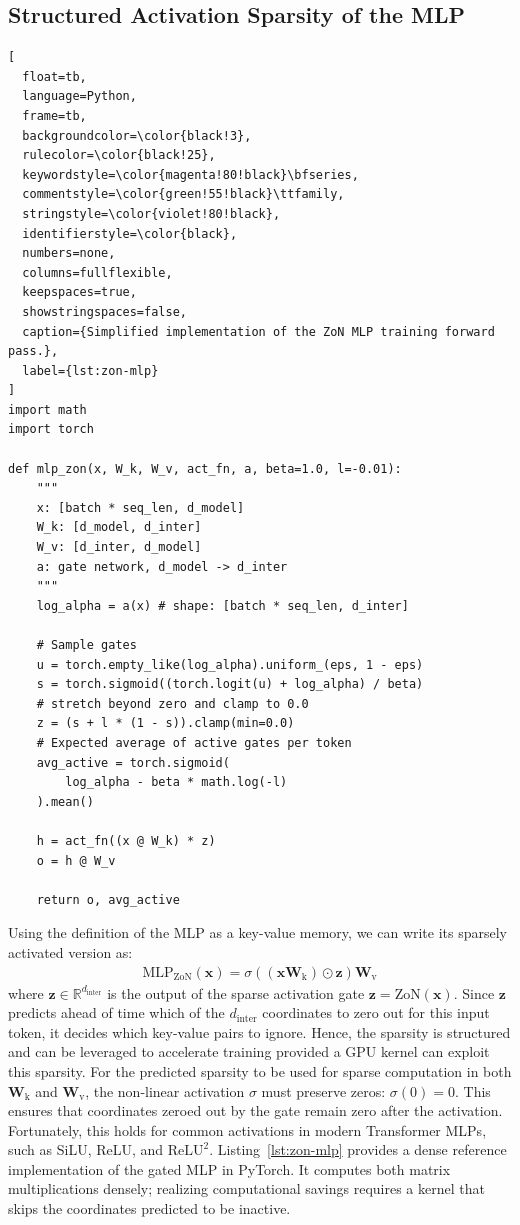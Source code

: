 \subsection{Structured Activation Sparsity of the MLP}
\begin{lstlisting}[
  float=tb,
  language=Python,
  frame=tb,
  backgroundcolor=\color{black!3},
  rulecolor=\color{black!25},
  keywordstyle=\color{magenta!80!black}\bfseries,
  commentstyle=\color{green!55!black}\ttfamily,
  stringstyle=\color{violet!80!black},
  identifierstyle=\color{black},
  numbers=none,
  columns=fullflexible,
  keepspaces=true,
  showstringspaces=false,
  caption={Simplified implementation of the ZoN MLP training forward pass.},
  label={lst:zon-mlp}
]
import math
import torch

def mlp_zon(x, W_k, W_v, act_fn, a, beta=1.0, l=-0.01):
    """
    x: [batch * seq_len, d_model]
    W_k: [d_model, d_inter]
    W_v: [d_inter, d_model]
    a: gate network, d_model -> d_inter
    """
    log_alpha = a(x) # shape: [batch * seq_len, d_inter]

    # Sample gates
    u = torch.empty_like(log_alpha).uniform_(eps, 1 - eps)
    s = torch.sigmoid((torch.logit(u) + log_alpha) / beta)
    # stretch beyond zero and clamp to 0.0
    z = (s + l * (1 - s)).clamp(min=0.0)
    # Expected average of active gates per token
    avg_active = torch.sigmoid(
        log_alpha - beta * math.log(-l)
    ).mean()

    h = act_fn((x @ W_k) * z)
    o = h @ W_v

    return o, avg_active
\end{lstlisting}

Using the definition of the MLP as a key-value memory, we can write its sparsely activated version as:
\begin{align}
    \text{MLP}_{\text{ZoN}}(\mathbf{x}) = \sigma((\mathbf{x} \textbf{W}_{\text{k}}) \odot \mathbf{z}) \textbf{W}_{\text{v}}
\end{align}
where $\mathbf{z} \in \mathbb{R}^{d_{\text{inter}}}$ is the output of the sparse activation gate
$\mathbf{z} = {\mathrm{ZoN}}(\mathbf{x})$.
Since $\mathbf{z}$ predicts ahead of time which of the $d_{\text{inter}}$ coordinates to zero out
for this input token, it decides which key-value pairs to ignore. Hence,
the sparsity is structured and can be leveraged to accelerate training provided a GPU kernel can exploit this sparsity.
For the predicted sparsity to be used for sparse computation in both
$\textbf{W}_{\text{k}}$ and $\textbf{W}_{\text{v}}$, the non-linear activation
$\sigma$ must preserve zeros: $\sigma(0) = 0$. This ensures that coordinates
zeroed out by the gate remain zero after the activation. Fortunately, this holds
for common activations in modern Transformer MLPs, such as SiLU, ReLU, and
$\mathrm{ReLU}^{2}$.
Listing~\ref{lst:zon-mlp} provides a dense reference implementation of the gated MLP in PyTorch.
It computes both matrix multiplications densely; realizing computational savings
requires a kernel that skips the coordinates predicted to be inactive.

